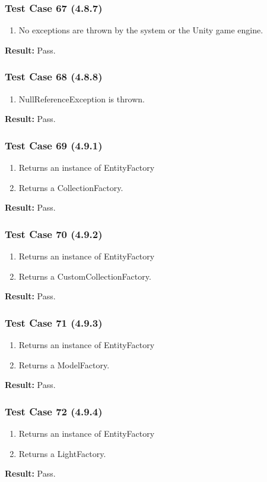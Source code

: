 \documentclass[a4paper,12pt]{article}
\begin{document}
		\subsubsection{Test Case 67 (4.8.7)}
				\begin{enumerate}
					\item No exceptions are thrown by the system or the Unity game engine.
				\end{enumerate}
			\textbf{Result: }Pass.
		\subsubsection{Test Case 68 (4.8.8)}
				\begin{enumerate}
					\item NullReferenceException is thrown.
				\end{enumerate}
			\textbf{Result: }Pass.
		\subsubsection{Test Case 69 (4.9.1)}
				\begin{enumerate}
					\item Returns an instance of EntityFactory
					\item Returns a CollectionFactory.
				\end{enumerate}
			\textbf{Result: }Pass.
		\subsubsection{Test Case 70 (4.9.2)}
				\begin{enumerate}
					\item Returns an instance of EntityFactory
					\item Returns a CustomCollectionFactory.
				\end{enumerate}
			\textbf{Result: }Pass.
		\subsubsection{Test Case 71 (4.9.3)}
				\begin{enumerate}
					\item Returns an instance of EntityFactory
					\item Returns a ModelFactory.
				\end{enumerate}
			\textbf{Result: }Pass.
		\subsubsection{Test Case 72 (4.9.4)}
				\begin{enumerate}
					\item Returns an instance of EntityFactory
					\item Returns a LightFactory.
				\end{enumerate}
			\textbf{Result: }Pass.
\end{document}
